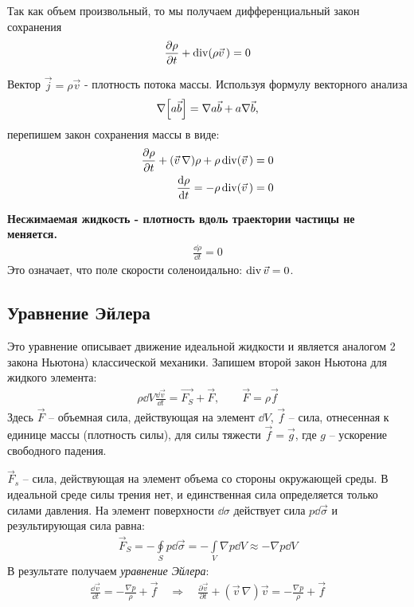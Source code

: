 Так как объем произвольный, то мы получаем дифференциальный закон сохранения
\begin{align*} 
\frac{\partial \rho}{\partial t}+\operatorname{div}(\rho \vec{v}\,)=0
\end{align*}

Вектор $ \vec{j}=\rho \vec{v} $ - плотность потока массы. Используя формулу векторного анализа
\begin{equation}
	\nabla\qty[a \vec{b}]=\nabla a \vec{b}+a \nabla \vec{b},
\end{equation}
перепишем закон сохранения массы в виде:
\begin{align*} 
\frac{\partial \rho}{\partial t}+(\vec{v}\,\nabla) \rho+\rho \operatorname{div}(\vec{v}\,)=0 \\
\frac{\dd \rho}{\dd t}=-\rho \operatorname{div}(\vec{v}\,)=0
\end{align*}

\textbf{Несжимаемая жидкость - плотность вдоль траектории частицы не меняется.}
\begin{align*} 
\frac{\dd \rho}{\dd t}=0
\end{align*}
Это означает, что поле скорости соленоидально: $\operatorname{div}\vec{v}=0$.

\subsection{Уравнение Эйлера}
Это уравнение описывает движение идеальной жидкости и является аналогом {2 закона Ньютона}) классической механики. Запишем второй закон Ньютона для жидкого элемента:
\begin{align*}
\rho\dd{V} \frac{\dd \vec{v}}{\dd t} =\vec{F_{S}}+\vec{F}, \qquad
\vec { F } = \rho \vec { f }
\end{align*}
Здесь $\vec{F}$ --  объемная сила, действующая на элемент $\dd V$, $\vec{f}$ -- сила, отнесенная к единице массы (плотность силы), для силы тяжести $\vec{f}=\vec{g}$, где $g$ -- ускорение свободного падения.

$\vec{F}_s$ -- сила, действующая на элемент объема со стороны окружающей среды.  В идеальной среде силы трения нет, и единственная сила определяется только силами давления. На элемент поверхности $\dd\sigma$ действует сила $ p \dd{\vec{\sigma}} $ и результирующая сила равна:
\begin{align*}
\vec { F } _ { S } = - \oint \limits_ { S } p \dd{\vec{\sigma}} = - \int \limits_ { V } \nabla p\dd{V} \approx - \nabla p\dd{V}
\end{align*}
В результате получаем \textit{уравнение Эйлера}:
\begin{align*}
\frac { \dd \vec{v} } { \dd t } = - \frac { \nabla p } { \rho } + \vec { f } 
\quad \Rightarrow \quad
\frac { \partial \vec{v} } { \partial t } + ( \vec{v}\,\nabla ) \vec{v} = - \frac { \nabla p } { \rho } + \vec { f }
\end{align*}

